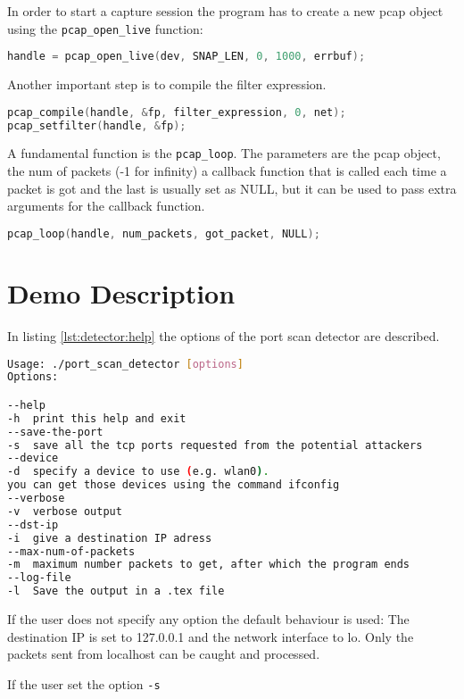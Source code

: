In order to start a capture session the program has to create a new pcap object using the \lstinline!pcap_open_live! function:
\begin{lstlisting}[frame= single, language=C, caption={Create a new pcap handler.}, label=lst:open_live]
handle = pcap_open_live(dev, SNAP_LEN, 0, 1000, errbuf);
\end{lstlisting}
Another important step is to compile the filter expression. 
\begin{lstlisting}[frame= single, language=C, caption=Pcap functions called to compile the filter expression and to set it.]
pcap_compile(handle, &fp, filter_expression, 0, net);
pcap_setfilter(handle, &fp);
\end{lstlisting}

A fundamental function is the \lstinline|pcap_loop|. The parameters are the pcap object,
the num of packets (-1 for infinity) a callback function that is called each time a packet
is got and the last is usually set as NULL, but it can be used to pass extra arguments for the
callback function.

\begin{lstlisting}[frame= single, language=C, caption=Pcap functions called to start getting the packets on the network (Error handling omitted).]
pcap_loop(handle, num_packets, got_packet, NULL);
\end{lstlisting}



\section{Demo Description}
In listing \ref{lst:detector:help} the options of the port scan detector are described.


\begin{lstlisting}[frame=single, language=BASH, label=lst:detector:help, caption=Help page of the port scan detector.]
Usage: ./port_scan_detector [options]
Options:

--help
-h	print this help and exit
--save-the-port
-s	save all the tcp ports requested from the potential attackers
--device
-d	specify a device to use (e.g. wlan0). 
you can get those devices using the command ifconfig
--verbose
-v	verbose output
--dst-ip
-i	give a destination IP adress
--max-num-of-packets
-m	maximum number packets to get, after which the program ends
--log-file
-l	Save the output in a .tex file
\end{lstlisting}
If the user does not specify any option the default behaviour is used:
The destination IP is set to 127.0.0.1 and the network interface to lo. Only
the packets sent from localhost can be caught and processed.

If the user set the option \lstinline{-s} 










